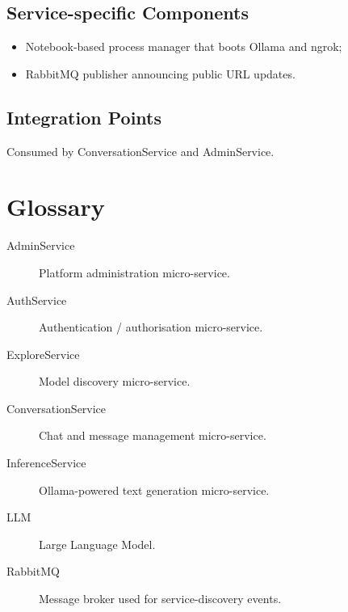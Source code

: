 \subsection{Service-specific Components}
\begin{itemize}
  \item Notebook-based process manager that boots Ollama and ngrok;
  \item RabbitMQ publisher announcing public URL updates.
\end{itemize}

\subsection{Integration Points}
Consumed by ConversationService and AdminService.

\section*{Glossary}
\begin{description}
  \item[AdminService] Platform administration micro-service.
  \item[AuthService] Authentication / authorisation micro-service.
  \item[ExploreService] Model discovery micro-service.
  \item[ConversationService] Chat and message management micro-service.
  \item[InferenceService] Ollama-powered text generation micro-service.
  \item[LLM] Large Language Model.
  \item[RabbitMQ] Message broker used for service-discovery events.
\end{description}
